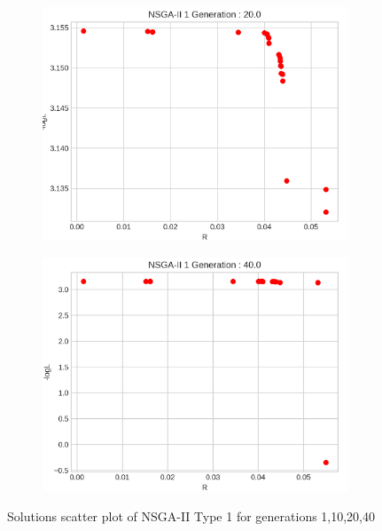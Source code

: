 \begin{figure}[H]
\begin{minipage}[b]{0.22\textwidth}
\begin{figure}[H]
  \end{figure}
  \end{minipage}
  \hspace{0.0cm}
  \begin{minipage}[b]{0.22\textwidth}
  \begin{figure}[H]
      \centering
      \includegraphics[width=\textwidth]{images/1-NSGA-II 1 Generation _ 20.0-R - logL-point.png}
  \end{figure}
  \end{minipage}
  \hspace{0.0cm}
  \begin{minipage}[b]{0.22\textwidth}
  \begin{figure}[H]
      \centering
      \includegraphics[width=\textwidth]{images/1-NSGA-II 1 Generation _ 40.0-R - logL-point.png}
  \end{figure}
  \end{minipage}
  \caption{Solutions scatter plot of NSGA-II Type 1 for generations 1,10,20,40}
  \label{fig:2x2group}
\end{figure}
